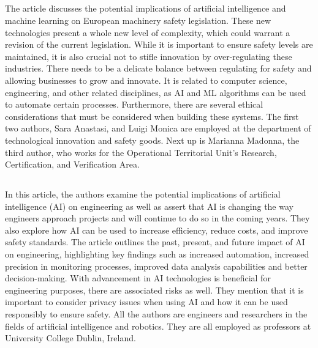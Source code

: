 \documentclass[12pt,letterpaper]{article}
\begin{document}
\subsection*{}
The article discusses the potential implications of artificial intelligence and machine learning on European machinery safety legislation. These new technologies present a whole new level of complexity, which could warrant a revision of the current legislation. While it is important to ensure safety levels are maintained, it is also crucial not to stifle innovation by over-regulating these industries. There needs to be a delicate balance between regulating for safety and allowing businesses to grow and innovate. It is related to computer science, engineering, and other related disciplines, as AI and ML algorithms can be used to automate certain processes. Furthermore, there are several ethical considerations that must be considered when building these systems. The first two authors, Sara Anastasi, and Luigi Monica are employed at the department of technological innovation and safety goods. Next up is Marianna Madonna, the third author, who works for the Operational Territorial Unit's Research, Certification, and Verification Area.


\subsection*{}
In this article, the authors examine the potential implications of artificial intelligence (AI) on engineering as well as assert that AI is changing the way engineers approach projects and will continue to do so in the coming years. They also explore how AI can be used to increase efficiency, reduce costs, and improve safety standards. The article outlines the past, present, and future impact of AI on engineering, highlighting key findings such as increased automation, increased precision in monitoring processes, improved data analysis capabilities and better decision-making. With advancement in AI technologies is beneficial for engineering purposes, there are associated risks as well. They mention that it is important to consider privacy issues when using AI and how it can be used responsibly to ensure safety. All the authors are engineers and researchers in the fields of artificial intelligence and robotics. They are all employed as professors at University College Dublin, Ireland.
\end{document}
